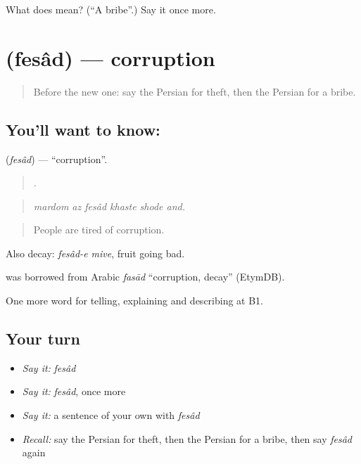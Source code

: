 \begin{tcolorbox}[breakable,colback=teal!4,colframe=teal!35!black,title={Before you move on}]
What does  mean? (\textquotedblleft{}A bribe\textquotedblright{}.) Say it once more.
\end{tcolorbox}
\section[\texorpdfstring{\fa{فساد} (fesâd)}{فساد (fesâd)}]{ (fesâd) — corruption}

\label{lesson:FA-C408-fesad}



\begin{quote}
Before the new one: say the Persian for theft, then the Persian for a bribe.
\end{quote}

\subsection*{You'll want to know: }
\textbf{} (\emph{fesâd}) — \textquotedblleft{}corruption\textquotedblright{}.

\begin{quote}
     .
\end{quote}

\begin{quote}
\emph{mardom az fesâd khaste shode and.}
\end{quote}

\begin{quote}
People are tired of corruption.
\end{quote}

Also decay: \emph{fesâd-e mive}, fruit going bad.

\begin{cousinweb}
\textbf{} was borrowed from Arabic \emph{fasād} \textquotedblleft{}corruption, decay\textquotedblright{} (EtymDB).
\end{cousinweb}

\begin{grammarlens}[title={What you've built}]
One more word for telling, explaining and describing at B1.
\end{grammarlens}

\subsection*{Your turn}
\begin{itemize}
\raggedright
  \item \emph{Say it:} \emph{fesâd}
  \item \emph{Say it:} \emph{fesâd}, once more
  \item \emph{Say it:} a sentence of your own with \emph{fesâd}
  \item \emph{Recall:} say the Persian for theft, then the Persian for a bribe, then say \emph{fesâd} again
\end{itemize}

